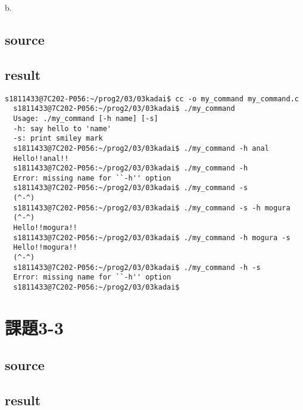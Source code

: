 \documentclass[10pt,a4paper]{jsarticle}
\begin{document}
b.
\subsection{source}



\subsection{result}
\begin{lstlisting}[basicstyle=\ttfamily\footnotesize,frame=single]
  s1811433@7C202-P056:~/prog2/03/03kadai$ cc -o my_command my_command.c
  s1811433@7C202-P056:~/prog2/03/03kadai$ ./my_command
  Usage: ./my_command [-h name] [-s]
  -h: say hello to 'name'
  -s: print smiley mark
  s1811433@7C202-P056:~/prog2/03/03kadai$ ./my_command -h anal
  Hello!!anal!!
  s1811433@7C202-P056:~/prog2/03/03kadai$ ./my_command -h
  Error: missing name for ``-h'' option
  s1811433@7C202-P056:~/prog2/03/03kadai$ ./my_command -s
  (^-^)
  s1811433@7C202-P056:~/prog2/03/03kadai$ ./my_command -s -h mogura
  (^-^)
  Hello!!mogura!!
  s1811433@7C202-P056:~/prog2/03/03kadai$ ./my_command -h mogura -s
  Hello!!mogura!!
  (^-^)
  s1811433@7C202-P056:~/prog2/03/03kadai$ ./my_command -h -s
  Error: missing name for ``-h'' option
  s1811433@7C202-P056:~/prog2/03/03kadai$
\end{lstlisting}


\section{課題3-3}
\subsection{source}


\subsection{result}
\end{document}
